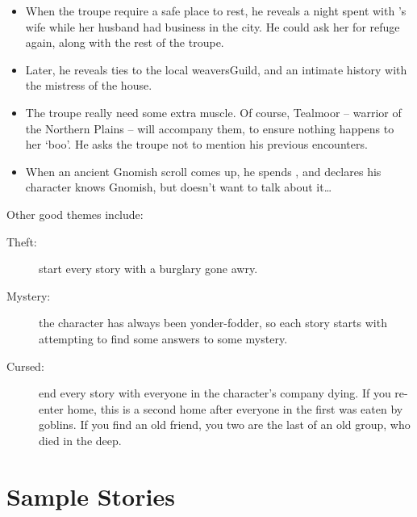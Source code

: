 \begin{multicols}{2}
\begin{itemize}
  \item
  When the troupe require a safe place to rest, he reveals a night spent with 's wife while her husband had business in the city.
  He could ask her for refuge again, along with the rest of the troupe.
  \item
  Later, he reveals ties to the local \gls{weaversGuild}, and an intimate history with the mistress of the house.
  \item
  The troupe really need some extra muscle.
  Of course, Tealmoor -- warrior of the Northern Plains -- will accompany them, to ensure nothing happens to her `boo'.
  He asks the troupe not to mention his previous encounters.
  \item
  When an ancient Gnomish scroll comes up, he spends , and declares his character knows Gnomish, but doesn't want to talk about it\ldots
\end{itemize}

Other good themes include:

\begin{description}
  \item[Theft:]
  start every story with a burglary gone awry.
  \item[Mystery:]
  the character has always been \gls{yonder}-fodder, so each story starts with attempting to find some answers to some mystery.
  \item[Cursed:]
  end every story with everyone in the character's company dying.
  If you re-enter home, this is a second home after everyone in the first was eaten by goblins.
  If you find an old friend, you two are the last of an old group, who died in the \gls{deep}.
\end{description}

\end{multicols}

\section{Sample Stories}

